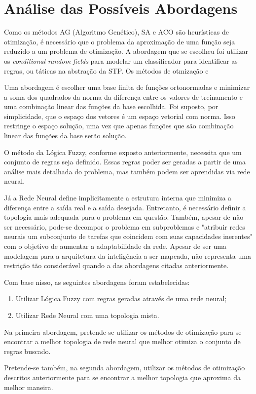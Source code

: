 \chapter{Análise das Possíveis Abordagens}\label{cap:anal_abordagens}


Como os métodos AG (Algoritmo Genético),
SA e ACO são heurísticas de otimização, é necessário que o problema da aproximação
de uma função seja reduzido a um problema de otimização. A abordagem que se escolheu
foi utilizar os \textit{conditional random fields} para modelar um classificador
para identificar as regras, ou táticas na abstração da STP. Os métodos de otmização
e


Uma abordagem é escolher uma
base finita de funções ortonormadas e minimizar a soma dos quadrados da norma da diferença
entre os valores de treinamento e uma combinação linear das funções da base escolhida.
Foi suposto, por simplicidade, que o espaço dos vetores é um espaço vetorial com norma. Isso restringe o
espaço solução, uma vez que apenas funções que são combinação linear das funções da base serão solução.

O método da Lógica Fuzzy, conforme exposto anteriormente, necessita que um conjunto de regras seja definido.
Essas regras poder ser geradas a partir de uma análise mais detalhada do problema, mas também podem ser
aprendidas via rede neural.

Já a Rede Neural define implicitamente a estrutura interna
que minimiza a diferença entre a saída real e a saída desejada.
Entretanto, é necessário definir a topologia mais adequada para o
problema em questão. Também, apesar de não ser necessário, pode-se
decompor o problema em subproblemas e "atribuir redes neurais um
subconjunto de tarefas que coincidem com suas capacidades
inerentes" \cite[pag. 29]{haykin2001redes} com o objetivo de aumentar a
adaptabilidade da rede. Apesar de ser uma modelagem para a arquitetura
da inteligência a ser mapeada, não representa uma restrição tão
considerável quando a das abordagens citadas anteriormente.

Com base nisso, as seguintes abordagens foram estabelecidas:

\begin{enumerate}
 \item Utilizar Lógica Fuzzy com regras geradas através de uma rede neural;
 \item Utilizar Rede Neural com uma topologia mista.
\end{enumerate}

Na primeira abordagem, pretende-se utilizar os métodos de otimização para se
encontrar a melhor topologia de rede neural que melhor otimiza o conjunto de
regras buscado.

Pretende-se também, na segunda abordagem, utilizar os métodos de otimização
descritos anteriormente para se encontrar a melhor topologia que aproxima da
melhor maneira.


